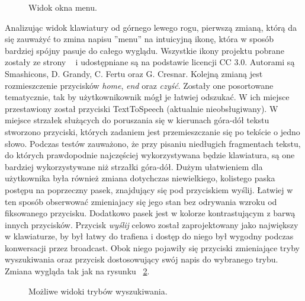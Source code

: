 \documentclass[twoside,a4paper]{book}
\begin{document}
\begin{figure}
		\centering
		\caption{Widok okna menu.}
		\label{fig:menu}
		\end{figure}
 Analizując widok klawiatury od górnego lewego rogu, pierwszą zmianą, którą da się zauważyć to zmina napisu ''menu'' na intuicyjną ikonę, która w sposób bardziej spójny pasuje do całego wyglądu. Wszystkie ikony projektu pobrane zostały ze strony ~\cite{resource} i udostępniane są na podstawie licencji CC 3.0. Autorami są Smashicons, D. Grandy, C. Fertu oraz G. Cresnar. Kolejną zmianą jest rozmieszczenie przycisków \textit{home}, \textit{end} oraz \textit{czyść}. Zostały one posortowane tematycznie, tak by użytkownikownik mógł je łatwiej odszukać. W ich miejsce przestawiony został przyciski TextToSpeech (aktualnie nieobsługiwany). W miejsce strzałek służących do poruszania się w kierunach góra-dół tekstu stworzono przyciski, których zadaniem jest przemieszczanie się po tekście o jedno słowo. Podczas testów zauważono, że przy pisaniu niedługich fragmentach tekstu, do których prawdopodnie najczęściej wykorzystywana będzie klawiatura, są one bardziej wykorzystywane niż strzałki góra-dół. 
Dużym ułatwieniem dla użytkownika była również zmiana dotychczas niewielkiego, kolistego paska postępu na poprzeczny pasek, znajdujący się pod przyciskiem wyślij. Łatwiej w ten sposób obserwować zmieniajacy się jego stan bez odrywania wzroku od fiksowanego przycisku. Dodatkowo pasek jest w kolorze kontrastującym z barwą innych przycisków. Przycisk \textit{wyślij} celowo został zaprojektowany jako największy w klawiaturze, by był łatwy do trafiena i dostęp do niego był wygodny podczas konwersacji przez broadcast. 
Obok niego pojawiły się przyciski zmieniające tryby wyszukiwania oraz przycisk dostosowujący swój napis do wybranego trybu. Zmiana wygląda tak jak na rysunku ~\ref{fig:searchType}.
\begin{figure}
		\centering
		\caption{Możliwe widoki trybów wyszukiwania.}
		\label{fig:searchType}
		\end{figure}
\end{document}
